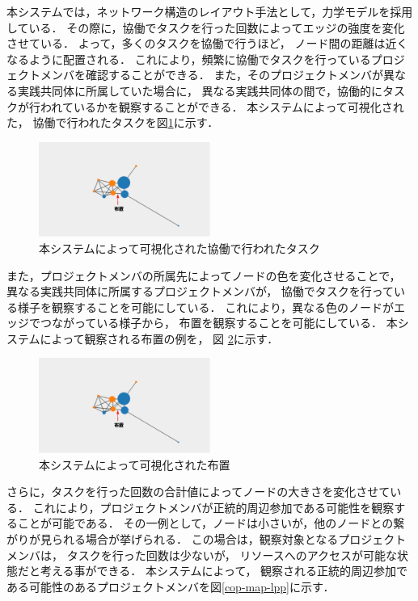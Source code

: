 \documentclass[submit,techrep]{ipsj}
\begin{document}
本システムでは，ネットワーク構造のレイアウト手法として，力学モデルを採用している．
その際に，協働でタスクを行った回数によってエッジの強度を変化させている．
よって，多くのタスクを協働で行うほど，
ノード間の距離は近くなるように配置される．
これにより，頻繁に協働でタスクを行っているプロジェクトメンバを確認することができる．
また，そのプロジェクトメンバが異なる実践共同体に所属していた場合に，
異なる実践共同体の間で，協働的にタスクが行われているかを観察することができる．
本システムによって可視化された，
協働で行われたタスクを図\ref{cop-map-task}に示す．

\begin{figure}[h]
  \centering
  \includegraphics[width=0.5\textwidth]{img/cop-map-task.eps}
  \caption{本システムによって可視化された協働で行われたタスク}
  \label{cop-map-task}
\end{figure}

また，プロジェクトメンバの所属先によってノードの色を変化させることで，
異なる実践共同体に所属するプロジェクトメンバが，
協働でタスクを行っている様子を観察することを可能にしている．
これにより，異なる色のノードがエッジでつながっている様子から，
布置を観察することを可能にしている．
本システムによって観察される布置の例を，
図 \ref{cop-map-overlap}に示す．

\begin{figure}[h]
  \centering
  \includegraphics[width=0.5\textwidth]{img/cop-map-overlap.eps}
  \caption{本システムによって可視化された布置}
  \label{cop-map-overlap}
\end{figure}

さらに，タスクを行った回数の合計値によってノードの大きさを変化させている．
これにより，プロジェクトメンバが正統的周辺参加である可能性を観察することが可能である．
その一例として，ノードは小さいが，他のノードとの繋がりが見られる場合が挙げられる．
この場合は，観察対象となるプロジェクトメンバは，
タスクを行った回数は少ないが，
リソースへのアクセスが可能な状態だと考える事ができる．
本システムによって，
観察される正統的周辺参加である可能性のあるプロジェクトメンバを図\ref{cop-map-lpp}に示す．
\end{document}
